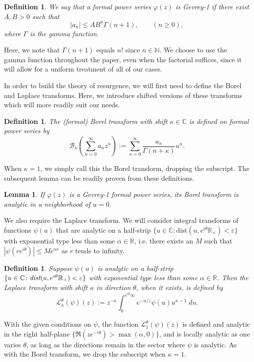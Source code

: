 \documentclass[12pt]{amsart}
\theoremstyle{definition}
\theoremstyle{plain}
\newtheorem{lemma}[theorem]{Lemma}
\newtheorem{definition}[theorem]{Definition}
\numberwithin{equation}{section}
\begin{document}
\begin{definition}
	We say that a formal power series $\varphi(z)$ is \textit{Gevrey-1} if there exist $A, B >0$ such that
	\[
	|a_n| \leq AB^n\Gamma(n+1), \quad  \quad (n \geq 0),
	\]
	where $\Gamma$ is the gamma function.
\end{definition}

Here, we note that $\Gamma(n+1)$ equals $n!$ since $n \in \mathbb{N}$. We choose to use the gamma function throughout the paper, even when the factorial suffices, since it will allow for a uniform treatment of all of our cases.

In order to build the theory of resurgence, we will first need to define the Borel and Laplace transforms. Here, we introduce shifted versions of these transforms which will more readily suit our needs. 

\begin{definition} The (formal) Borel transform with shift $\kappa  \in \mathbb{C}$ is defined on formal power series by  
\[\mathcal{B}_{\kappa}\left(\sum_{n=0}^\infty a_n z^n\right) := \sum_{n=0}^\infty \frac{a_n}{\Gamma(n+\kappa)}u^n.
\]
\end{definition}
When $\kappa  = 1$, we simply call this the Borel transform, dropping the subscript. 
The subsequent lemma can be readily proven from these definitions. 

\begin{lemma}
If $\varphi(z)$ is a Gevrey-1 formal power series, its Borel transform is analytic in a neighborhood of $u=0$.	
\end{lemma}

We also require the Laplace transform. We will consider integral transforms of functions $\psi(u)$ that are analytic on a half-strip $\{u \in \mathbb{C} \colon \text{dist}(u, e^{i\theta}\mathbb{R}_+) < \varepsilon\}$ with exponential type less than some $\alpha \in \mathbb{R}$, i.e. there exists an $M$ such that $|\psi(re^{i\theta})| \leq Me^{\alpha r}$ as $r$ tends to infinity.

\begin{definition} Suppose $\psi(u)$ is analytic on a half-strip $\{u \in \mathbb{C} \colon \emph{dist}(u, e^{i\theta}\mathbb{R}_+) < \varepsilon\}$ with exponential type less than some $\alpha \in \mathbb{R}$. Then the Laplace transform with shift $\kappa$ in direction $\theta$, when it exists, is defined by 
\[\mathcal{L}_{\kappa}^\theta (\psi)(z) := z^{-\kappa} \int_0^{e^{i\theta}\infty}e^{-u/z} \psi(u) u^{\kappa-1}\;du.
\]
\end{definition}
With the given conditions on $\psi$, the function $\mathcal{L}_{1}^\theta(\psi)(z)$ is defined and analytic in the right half-plane $\{\Re(ze^{-i\theta})> \max(\alpha, 0)\}$, and is locally analytic as one varies $\theta$, as long as the directions remain in the sector where $\psi$ is analytic. As with the Borel transform, we drop the subscript when $\kappa=1$.  
\end{document}
